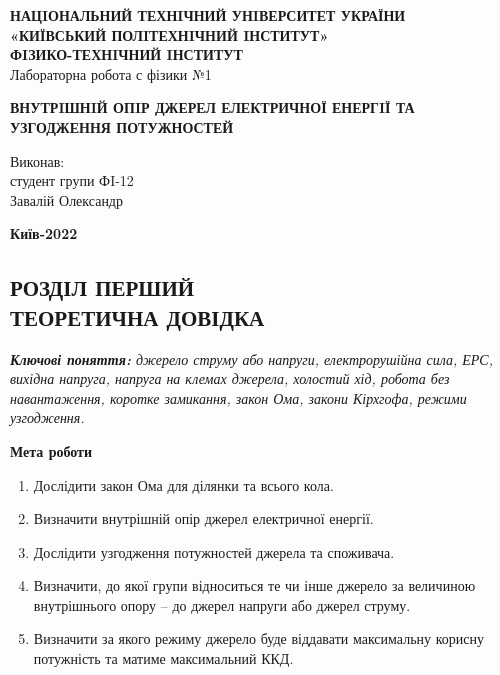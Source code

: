 \documentclass[a4paper,12pt]{article}
\begin{document}
	
	\begin{center}
		\hfill \break
		\large{\textbf{НАЦIОНАЛЬНИЙ ТЕХНIЧНИЙ УНIВЕРСИТЕТ УКРАЇНИ\\
			«КИЇВСЬКИЙ ПОЛIТЕХНIЧНИЙ IНСТИТУТ»\\
			ФIЗИКО-ТЕХНIЧНИЙ IНСТИТУТ}}\\
		\hfill \break \hfill \break \hfill\break \hfill \break \hfill \break \hfill \break \hfill \break
		\hfill \break \hfill \break
		\large{Лабораторна робота с фізики №1}
		\begin{center}
			\normalsize{\textbf{ВНУТРIШНIЙ ОПIР ДЖЕРЕЛ ЕЛЕКТРИЧНОЇ ЕНЕРГIЇ ТА УЗГОДЖЕННЯ ПОТУЖНОСТЕЙ}}
		\end{center}
	\end{center}
	\hfill \break \hfill \break \hfill \break \hfill \break \hfill \break \hfill \break \hfill \break
	\hfill \break \hfill \break \hfill \break \hfill \break \hfill \break \hfill \break 
	\begin{flushright}
		\large{ \hspace{35pt} Виконав:\\
		студент групи ФI-12\\
		Завалій Олександр} 
	\end{flushright}
	\hfill \break \hfill \break \hfill \break \hfill \break \hfill \break \hfill \break \hfill \break
	\hfill \break \hfill \break 
	\begin{center} \textbf{Київ-2022} \end{center}
	\thispagestyle{empty} %
	
	\newpage
	\begin{center}
		\section* {РОЗДІЛ ПЕРШИЙ\\ТЕОРЕТИЧНА ДОВІДКА }
	\end{center}
	\textit{\textbf{Ключові поняття:} джерело струму або напруги, електрорушійна сила, ЕРС, вихідна напруга, напруга на клемах джерела, холостий хід, робота без навантаження, коротке замикання, закон Ома, закони Кірхгофа, режими узгодження. }
	
	\begin{center}
		\textbf{Мета роботи}
	\end{center}
	\begin{enumerate}
		\item Дослідити закон Ома для ділянки та всього кола.  
		\item Визначити внутрішній опір джерел електричної енергії.  
		\item Дослідити узгодження потужностей джерела та споживача.  
		\item Визначити, до якої групи відноситься те чи інше джерело за величиною внутрішнього опору – до джерел напруги або джерел струму.  
		\item Визначити за якого режиму джерело буде віддавати максимальну корисну потужність та матиме максимальний ККД. 
	\end{enumerate}
	
\end{document}
